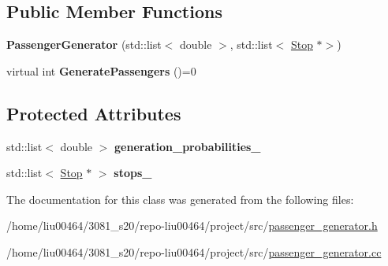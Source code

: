 \subsection*{Public Member Functions}
\begin{DoxyCompactItemize}
\item 
\mbox{\label{classPassengerGenerator_a33eeed8b68d5d596ceef5381c697e49d}} 
{\bfseries Passenger\+Generator} (std\+::list$<$ double $>$, std\+::list$<$ \hyperlink{classStop}{Stop} $\ast$$>$)
\item 
\mbox{\label{classPassengerGenerator_ad2db96a13b34fcf35977287c06b31d47}} 
virtual int {\bfseries Generate\+Passengers} ()=0
\end{DoxyCompactItemize}
\subsection*{Protected Attributes}
\begin{DoxyCompactItemize}
\item 
\mbox{\label{classPassengerGenerator_a855471e5532fec3f387a6340f928d43a}} 
std\+::list$<$ double $>$ {\bfseries generation\+\_\+probabilities\+\_\+}
\item 
\mbox{\label{classPassengerGenerator_ab09ab7ca9104385ae007d05a6e957884}} 
std\+::list$<$ \hyperlink{classStop}{Stop} $\ast$ $>$ {\bfseries stops\+\_\+}
\end{DoxyCompactItemize}


The documentation for this class was generated from the following files\+:\begin{DoxyCompactItemize}
\item 
/home/liu00464/3081\+\_\+s20/repo-\/liu00464/project/src/\hyperlink{passenger__generator_8h}{passenger\+\_\+generator.\+h}\item 
/home/liu00464/3081\+\_\+s20/repo-\/liu00464/project/src/\hyperlink{passenger__generator_8cc}{passenger\+\_\+generator.\+cc}\end{DoxyCompactItemize}
